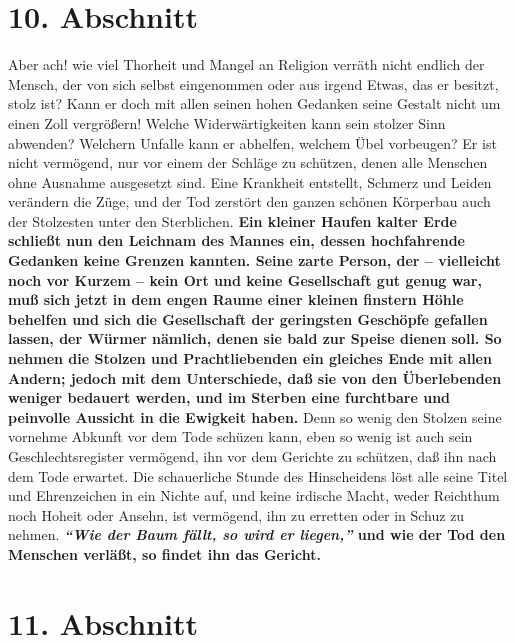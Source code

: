 \section{10. Abschnitt} \label{kap12_ab10}

Aber ach! wie viel Thorheit und Mangel an Religion verräth nicht endlich der
Mensch, der von sich selbst eingenommen oder aus irgend Etwas, das er besitzt,
stolz ist? Kann er doch mit allen seinen hohen Gedanken seine Gestalt nicht um
einen Zoll vergrößern! Welche Widerwärtigkeiten kann sein stolzer Sinn abwenden?
Welchern Unfalle kann er abhelfen, welchem Übel vorbeugen? Er ist nicht
vermögend, nur vor einem der Schläge zu schützen, denen alle Menschen ohne
Ausnahme ausgesetzt sind.
Eine Krankheit entstellt,
Schmerz und Leiden
verändern die Züge, und der Tod zerstört den ganzen schönen Körperbau auch der
Stolzesten unter den Sterblichen. \textbf{Ein kleiner Haufen kalter Erde
schließt nun
den Leichnam des Mannes ein, dessen hochfahrende Gedanken keine Grenzen kannten.
Seine zarte Person, der -- vielleicht noch vor Kurzem -- kein Ort und keine
Gesellschaft gut genug war, muß sich jetzt in dem engen Raume einer kleinen
finstern Höhle behelfen und sich die Gesellschaft der geringsten Geschöpfe
gefallen lassen, der Würmer nämlich, denen sie bald zur Speise dienen soll. So
nehmen die Stolzen und Prachtliebenden ein gleiches Ende mit allen Andern;
jedoch mit dem Unterschiede, daß sie von den Überlebenden weniger
bedauert
werden, und im Sterben eine furchtbare und peinvolle Aussicht in die Ewigkeit
haben.} Denn so wenig den Stolzen seine vornehme Abkunft vor dem Tode schüzen
kann, eben so wenig ist auch sein Geschlechtsregister vermögend, ihn vor dem
Gerichte zu schützen, daß ihn nach dem Tode erwartet. Die schauerliche Stunde
des Hinscheidens löst alle seine Titel und Ehrenzeichen in ein Nichte auf, und
keine irdische Macht, weder Reichthum noch Hoheit oder Ansehn, ist vermögend,
ihn zu erretten oder in Schuz zu nehmen. \textbf{\textit{"`Wie der Baum fällt,
so wird er
liegen,"'} und wie der Tod den Menschen verläßt, so findet ihn das Gericht.}

\section{11. Abschnitt} \label{kap12_ab11}

